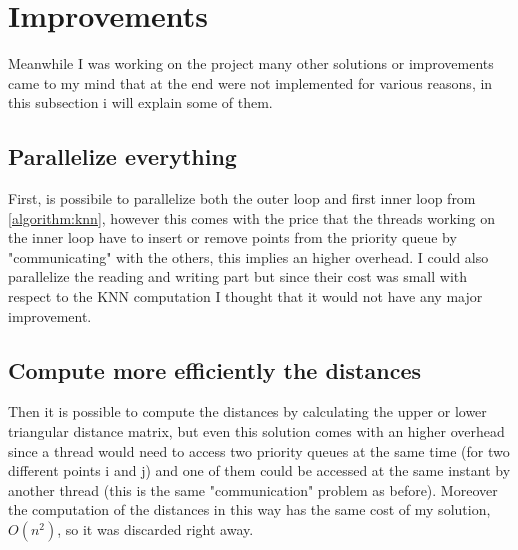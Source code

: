 \section{Improvements}
Meanwhile I was working on the project many other solutions or improvements came to my mind that at the end were not implemented for various reasons, in this subsection i will explain some of them.
\vspace{3mm}

\subsection{Parallelize everything}
First, is possibile to parallelize both the outer loop and first inner loop from \autoref{algorithm:knn}, however this comes with the price that the threads working on the inner loop have to insert or remove points from the priority queue by "communicating" with the others, this implies an higher overhead.
I could also parallelize the reading and writing part but since their cost was small with respect to the KNN computation I thought that it would not have any major improvement.
\vspace{3mm}

\subsection{Compute more efficiently the distances}
Then it is possible to compute the distances by calculating the upper or lower triangular distance matrix, but even this solution comes with an higher overhead since a thread would need to access two priority queues at the same time (for two different points i and j) and one of them could be accessed at the same instant by another thread (this is the same "communication" problem as before). Moreover the computation of the distances in this way has the same cost of my solution, $O(n^2)$, so it was discarded right away.
\vspace{3mm}
